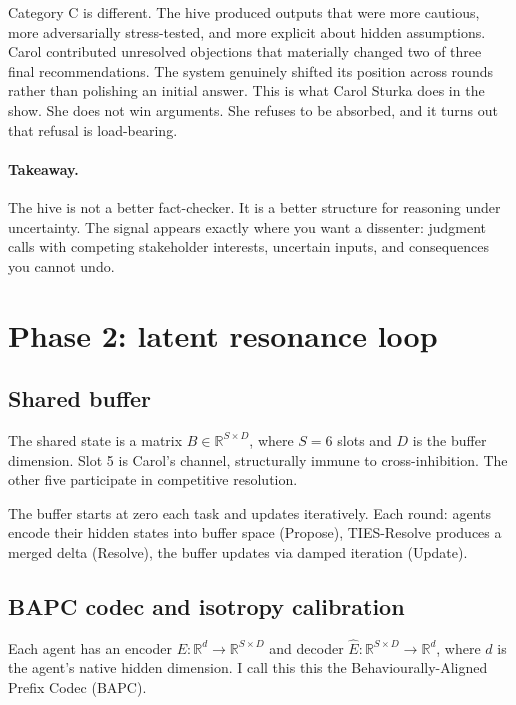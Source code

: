 \documentclass[10pt,twocolumn]{article}
\begin{document}
Category C is different. The hive produced outputs that were more cautious, more adversarially stress-tested, and more explicit about hidden assumptions. Carol contributed unresolved objections that materially changed two of three final recommendations. The system genuinely shifted its position across rounds rather than polishing an initial answer. This is what Carol Sturka does in the show. She does not win arguments. She refuses to be absorbed, and it turns out that refusal is load-bearing.

\paragraph{Takeaway.}
The hive is not a better fact-checker. It is a better structure for reasoning under uncertainty. The signal appears exactly where you want a dissenter: judgment calls with competing stakeholder interests, uncertain inputs, and consequences you cannot undo.

\section{Phase 2: latent resonance loop}
\label{sec:architecture}

\subsection{Shared buffer}

The shared state is a matrix $B \in \mathbb{R}^{S \times D}$, where $S = 6$ slots and $D$ is the buffer dimension. Slot 5 is Carol's channel, structurally immune to cross-inhibition. The other five participate in competitive resolution.

The buffer starts at zero each task and updates iteratively. Each round: agents encode their hidden states into buffer space (Propose), TIES-Resolve produces a merged delta (Resolve), the buffer updates via damped iteration (Update).

\subsection{BAPC codec and isotropy calibration}
\label{sec:isocal}

Each agent has an encoder $E: \mathbb{R}^{d} \to \mathbb{R}^{S \times D}$ and decoder $\hat{E}: \mathbb{R}^{S \times D} \to \mathbb{R}^{d}$, where $d$ is the agent's native hidden dimension. I call this this the Behaviourally-Aligned Prefix Codec (BAPC).
\end{document}
